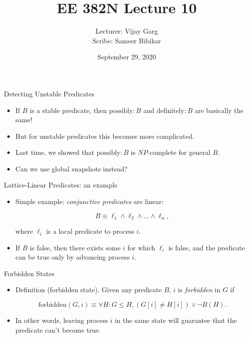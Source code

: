 \documentclass{beamer}
\title{EE 382N Lecture 10}
\author{Lecturer: Vijay Garg \\ Scribe: Sameer Bibikar}
\date{September 29, 2020}
\begin{document}
\begin{frame}
\titlepage
\end{frame}

\begin{frame}{Detecting Unstable Predicates}
\begin{itemize}
\item If $B$ is a stable predicate, then $\textrm{possibly} : B$
and $\textrm{definitely} : B$ are basically the same!

\item But for unstable predicates this becomes more complicated.

\item Last time, we showed that $\textrm{possibly} : B$ is
$NP$-complete for general $B$.

\item Can we use global snapshots instead?
\end{itemize}
\end{frame}

\begin{frame}{Lattice-Linear Predicates: an example}
    \begin{itemize}
        \item Simple example: \emph{conjunctive predicates} are linear:
        
        $$B \equiv \ell_1 \wedge \ell_2 \wedge \dots \wedge \ell_n,$$
        
        where $\ell_i$ is a local predicate to process $i$.
        \item If $B$ is false, then there exists some $i$ for which
        $\ell_i$ is false, and the predicate can be true only by
        advancing process $i$.
    \end{itemize}
\end{frame}

\begin{frame}{Forbidden States}
    \begin{itemize}
        \item Definition (forbidden state). Given any predicate $B$,
        $i$ is \emph{forbidden} in $G$ if
        
        $$\mathrm{forbidden}(G, i) \equiv \forall H : G \le H,
        (G[i] \ne H[i]) \vee \neg B(H).$$
        \item In other words, leaving process $i$ in the same state
        will guarantee that the predicate can't become true.
    \end{itemize}
\end{frame}
\end{document}
